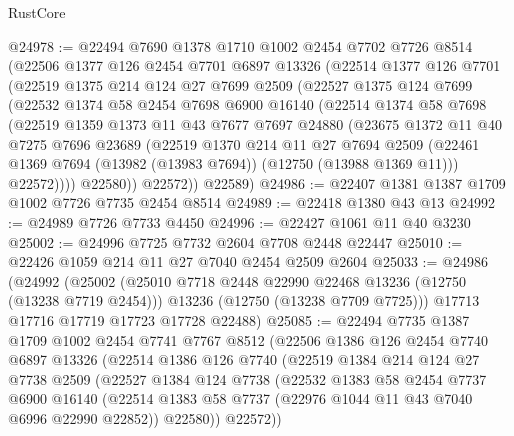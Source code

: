 \begin{lexlean}{RustCore}
\begin{coremodule}
@24978 := @22494
    @7690
    @1378
    @1710
    @1002
    @2454
    @7702
    @7726
    @8514
    (@22506
      @1377
      @126
      @2454
      @7701
      @6897
      @13326
      (@22514
        @1377
        @126
        @7701
        (@22519
          @1375
          @214
          @124
          @27
          @7699
          @2509
          (@22527
            @1375
            @124
            @7699
            (@22532
              @1374
              @58
              @2454
              @7698
              @6900
              @16140
              (@22514
                @1374
                @58
                @7698
                (@22519
                  @1359
                  @1373
                  @11
                  @43
                  @7677
                  @7697
                  @24880
                  (@23675
                    @1372
                    @11
                    @40
                    @7275
                    @7696
                    @23689
                    (@22519
                      @1370
                      @214
                      @11
                      @27
                      @7694
                      @2509
                      (@22461 @1369 @7694 (@13982 (@13983 @7694)) (@12750 (@13988 @1369 @11)))
                      @22572))))
              @22580))
          @22572))
      @22589)
@24986 := @22407 @1381 @1387 @1709 @1002 @7726 @7735 @2454 @8514
@24989 := @22418 @1380 @43 @13
@24992 := @24989 @7726 @7733 @4450
@24996 := @22427 @1061 @11 @40 @3230
@25002 := @24996 @7725 @7732 @2604 @7708 @2448 @22447
@25010 := @22426 @1059 @214 @11 @27 @7040 @2454 @2509 @2604
@25033 := @24986
    (@24992
      (@25002
        (@25010 @7718 @2448 @22990 @22468 @13236 (@12750 (@13238 @7719 @2454)))
        @13236
        (@12750 (@13238 @7709 @7725)))
      @17713
      @17716
      @17719
      @17723
      @17728
      @22488)
@25085 := @22494
    @7735
    @1387
    @1709
    @1002
    @2454
    @7741
    @7767
    @8512
    (@22506
      @1386
      @126
      @2454
      @7740
      @6897
      @13326
      (@22514
        @1386
        @126
        @7740
        (@22519
          @1384
          @214
          @124
          @27
          @7738
          @2509
          (@22527
            @1384
            @124
            @7738
            (@22532
              @1383
              @58
              @2454
              @7737
              @6900
              @16140
              (@22514 @1383 @58 @7737 (@22976 @1044 @11 @43 @7040 @6996 @22990 @22852))
              @22580))
          @22572))

\end{coremodule}
\end{lexlean}
